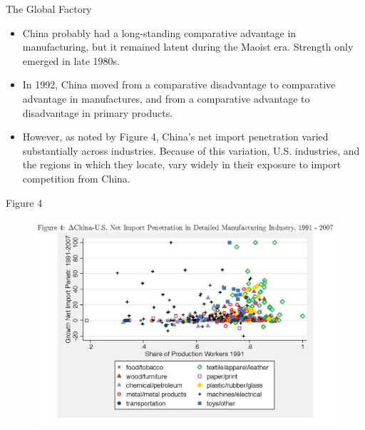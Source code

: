 \documentclass[aspectratio=169]{beamer}
\begin{document}

\begin{frame}{The Global Factory}

\begin{itemize}
    \item<1-> China probably had a long-standing comparative advantage in manufacturing, but it remained latent during the Maoist era.  Strength only emerged in late 1980s.
    \item<2-> In 1992, China moved from a comparative disadvantage to comparative advantage in manufactures, and from a comparative advantage to disadvantage in primary products.
    \item<3-> However, as noted by Figure 4, China’s net import penetration varied substantially across industries.  Because of this variation, U.S. industries, and the regions in which they locate, vary widely in their exposure to import competition from China.
\end{itemize}
    
\end{frame}


\begin{frame}{Figure 4}

\begin{figure}
    \centering
    \includegraphics[scale=0.6]{AutorDornHansonFig4.jpg}
    \label{fig:fig4}
\end{figure}
    
\end{frame}

\end{document}
